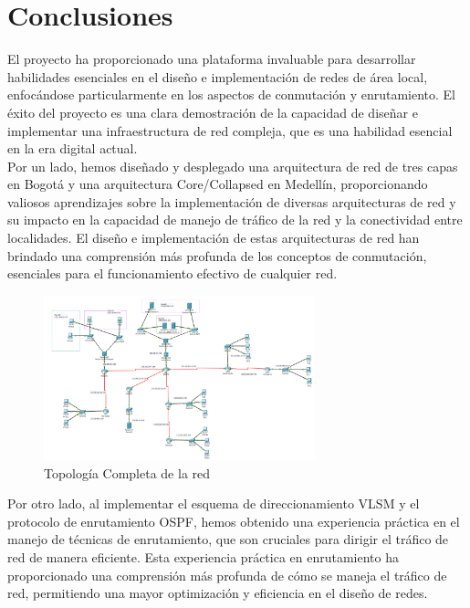 \section{Conclusiones}


El proyecto ha proporcionado una plataforma invaluable para desarrollar
habilidades esenciales en el diseño e implementación de redes de área local,
enfocándose particularmente en los aspectos de conmutación y enrutamiento. El
éxito del proyecto es una clara demostración de la capacidad de diseñar e
implementar una infraestructura de red compleja, que es una habilidad esencial
en la era digital actual.
\\

Por un lado, hemos diseñado y desplegado una arquitectura de red de tres capas
en Bogotá y una arquitectura Core/Collapsed en Medellín, proporcionando
valiosos aprendizajes sobre la implementación de diversas arquitecturas de red
y su impacto en la capacidad de manejo de tráfico de la red y la conectividad
entre localidades. El diseño e implementación de estas arquitecturas de red han
brindado una comprensión más profunda de los conceptos de conmutación,
esenciales para el funcionamiento efectivo de cualquier red.


\begin{figure}[H]
    \centering
    \includegraphics[width=0.7\textwidth]{Figures/4. Conclusions/final_result.png}
    \caption{Topología Completa de la red}
    \label{fig: Topologia Completa de la red}
\end{figure}


Por otro lado, al implementar el esquema de direccionamiento VLSM y el
protocolo de enrutamiento OSPF, hemos obtenido una experiencia práctica en el
manejo de técnicas de enrutamiento, que son cruciales para dirigir el tráfico
de red de manera eficiente. Esta experiencia práctica en enrutamiento ha
proporcionado una comprensión más profunda de cómo se maneja el tráfico de red,
permitiendo una mayor optimización y eficiencia en el diseño de redes.
\\

